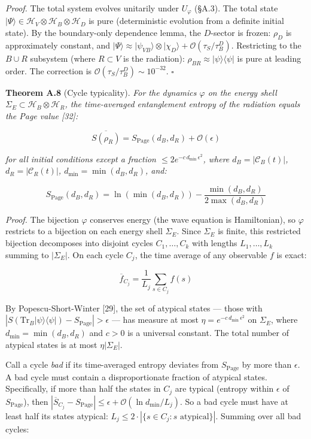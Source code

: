 \documentclass[
]{article}
\begin{document}
\emph{Proof.} The total system evolves unitarily under \(U_\varphi\)
(§A.3). The total state
\(|\Psi\rangle \in \mathcal{H}_V \otimes \mathcal{H}_B \otimes \mathcal{H}_D\)
is pure (deterministic evolution from a definite initial state). By the
boundary-only dependence lemma, the \(D\)-sector is frozen: \(\rho_D\)
is approximately constant, and
\(|\Psi\rangle \approx |\psi_{VB}\rangle \otimes |\chi_D\rangle + \mathcal{O}(\tau_S / \tau_B^D)\).
Restricting to the \(B \cup R\) subsystem (where \(R \subset V\) is the
radiation): \(\rho_{BR} \approx |\psi\rangle\langle\psi|\) is pure at
leading order. The correction is
\(\mathcal{O}(\tau_S / \tau_B^D) \sim 10^{-32}\). \(\square\)

\textbf{Theorem A.8} (Cycle typicality). \emph{For the dynamics
\(\varphi\) on the energy shell
\(\Sigma_E \subset \mathcal{H}_B \otimes \mathcal{H}_R\), the
time-averaged entanglement entropy of the radiation equals the Page
value {[}32{]}:}

\[\overline{S(\rho_R)} = S_{\text{Page}}(d_B, d_R) + \mathcal{O}(\epsilon)\]

\emph{for all initial conditions except a fraction
\(\leq 2e^{-c \, d_{\min} \, \epsilon^2}\), where
\(d_B = |\mathcal{C}_B(t)|\), \(d_R = |\mathcal{C}_R(t)|\),
\(d_{\min} = \min(d_B, d_R)\), and:}

\[S_{\text{Page}}(d_B, d_R) = \ln(\min(d_B, d_R)) - \frac{\min(d_B, d_R)}{2\max(d_B, d_R)}\]

\emph{Proof.} The bijection \(\varphi\) conserves energy (the wave
equation is Hamiltonian), so \(\varphi\) restricts to a bijection on
each energy shell \(\Sigma_E\). Since \(\Sigma_E\) is finite, this
restricted bijection decomposes into disjoint cycles
\(C_1, \ldots, C_k\) with lengths \(L_1, \ldots, L_k\) summing to
\(|\Sigma_E|\). On each cycle \(C_j\), the time average of any
observable \(f\) is exact:

\[\overline{f}_{C_j} = \frac{1}{L_j} \sum_{s \in C_j} f(s)\]

By Popescu-Short-Winter {[}29{]}, the set of atypical states --- those
with
\(|S(\text{Tr}_B |\psi\rangle\langle\psi|) - S_{\text{Page}}| > \epsilon\)
--- has measure at most \(\eta = e^{-c \, d_{\min} \, \epsilon^2}\) on
\(\Sigma_E\), where \(d_{\min} = \min(d_B, d_R)\) and \(c > 0\) is a
universal constant. The total number of atypical states is at most
\(\eta |\Sigma_E|\).

Call a cycle \emph{bad} if its time-averaged entropy deviates from
\(S_{\text{Page}}\) by more than \(\epsilon\). A bad cycle must contain
a disproportionate fraction of atypical states. Specifically, if more
than half the states in \(C_j\) are typical (entropy within \(\epsilon\)
of \(S_{\text{Page}}\)), then
\(|\overline{S}_{C_j} - S_{\text{Page}}| \leq \epsilon + \mathcal{O}(\ln d_{\min} / L_j)\).
So a bad cycle must have at least half its states atypical:
\(L_j \leq 2 \cdot |\{s \in C_j : s \text{ atypical}\}|\). Summing over
all bad cycles:
\end{document}
